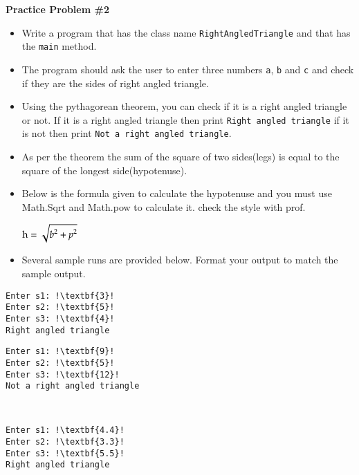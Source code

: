 \documentclass[12pt]{article}
\begin{document}
\vspace*{0.5cm}
\noindent\textbf{Practice Problem \#2}
\begin{itemize}
	\item Write a program that has the class name \texttt{RightAngledTriangle} and that has the \texttt{main} method.
	\item The program should ask the user to enter three numbers \texttt{a}, \texttt{b} and \texttt{c} and check if they are the sides of right angled triangle.
	\item Using the pythagorean theorem, you can check if it is a right angled triangle or not. If it is a right angled triangle then print \texttt{Right angled triangle} if it is not then print \texttt{Not a right angled triangle}. 
	\item As per the theorem the sum of the square of two sides(legs) is equal to the square of the longest side(hypotenuse). 
	\item Below is the formula given to calculate the hypotenuse and you must use Math.Sqrt and Math.pow to calculate it. check the style with prof.
\begin{center}
	$\rm{\mathtt{\displaystyle}\displaystyle h =  \sqrt{{\displaystyle}\displaystyle b^2 + \displaystyle p^2}}$
\end{center}
	\item Several sample runs are provided below. Format your output to match the sample output.
\end{itemize}
\begin{center}
\begin{minipage}{4cm}
\begin{lstlisting}[escapechar=!]
Enter s1: !\textbf{3}!
Enter s2: !\textbf{5}!
Enter s3: !\textbf{4}!
Right angled triangle
\end{lstlisting}
\end{minipage}
\hspace*{0.5cm}
\begin{minipage}{4.5cm}
\begin{lstlisting}[escapechar=!]
Enter s1: !\textbf{9}!
Enter s2: !\textbf{5}!
Enter s3: !\textbf{12}!
Not a right angled triangle
\end{lstlisting}
\end{minipage} \\
\vspace*{0.1cm}
\begin{minipage}{4cm}
\begin{lstlisting}[escapechar=!]
Enter s1: !\textbf{4.4}!
Enter s2: !\textbf{3.3}!
Enter s3: !\textbf{5.5}!
Right angled triangle
\end{lstlisting}
\end{minipage} 
\end{center}	
\end{document}
